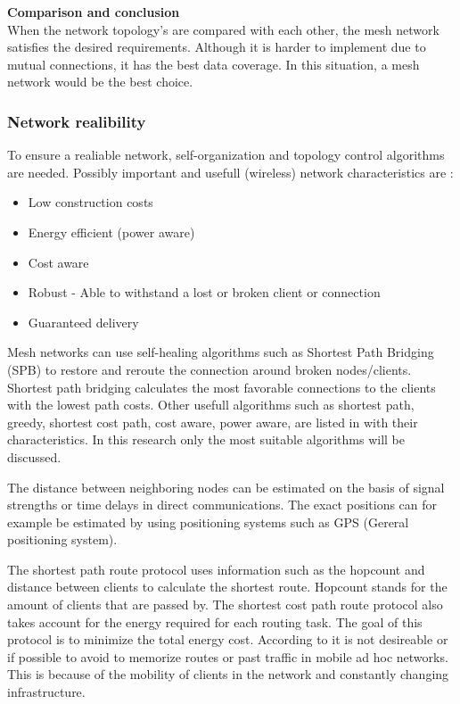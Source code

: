\documentclass[10pt,a4paper]{article}
\begin{document}
\textbf{Comparison and conclusion}\\
When the network topology's are compared with each other, the mesh network satisfies the desired requirements. Although it is harder to implement due to mutual connections, it has the best data coverage. In this situation, a mesh network would be the best choice.

\subsubsection{Network realibility}
To ensure a realiable network, self-organization and topology control algorithms are needed.\cite{WMN1} Possibly important and usefull (wireless) network characteristics are \cite{position-based}:
\begin{itemize}
\setlength\itemsep{0em}
    \item Low construction costs
    \item Energy efficient (power aware)
    \item Cost aware
    \item Robust - Able to withstand a lost or broken client or connection
    \item Guaranteed delivery
\end{itemize}

Mesh networks can use self-healing algorithms such as Shortest Path Bridging (SPB) to restore and reroute the connection around broken nodes/clients. Shortest path bridging calculates the most favorable connections to the clients with the lowest path costs. \cite{SPB} Other usefull algorithms such as shortest path, greedy, shortest cost path, cost aware, power aware, are listed in \cite{position-based} with their characteristics. In this research only the most suitable algorithms will be discussed. 

The distance between neighboring nodes can be estimated on the basis of signal strengths or time delays in direct communications. The exact positions can for example be estimated by using positioning systems such as GPS (Gereral positioning system). \cite{locationsystemsforubiquitouscomputing} 




The shortest path route protocol uses information such as the hopcount and distance between clients to calculate the shortest route. Hopcount stands for the amount of clients that are passed by. The shortest cost path route protocol also takes account for the energy required for each routing task. The goal of this protocol is to minimize the total energy cost. According to \cite{position-based} it is not desireable or if possible to avoid to memorize routes or past traffic in mobile ad hoc networks. This is because of the mobility of clients in the network and constantly changing infrastructure.
\end{document}
